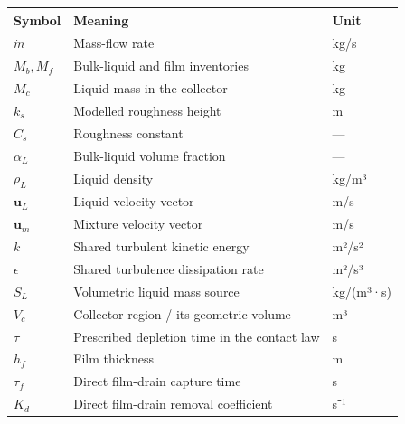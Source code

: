 \documentclass[12pt]{article}
\newcounter{none}
\begin{document}
\begingroup\small\setlength{\tabcolsep}{3pt}
{\def\LTcaptype{none} %
\begin{longtable}[]{@{}
  >{\raggedright\arraybackslash}p{}
  >{\raggedright\arraybackslash}p{}
  >{\raggedright\arraybackslash}p{}@{}}
\toprule\noalign{}
\begin{minipage}[b]{\linewidth}\raggedright
Symbol
\end{minipage} & \begin{minipage}[b]{\linewidth}\raggedright
Meaning
\end{minipage} & \begin{minipage}[b]{\linewidth}\raggedright
Unit
\end{minipage} \\
\midrule\noalign{}
\endhead
\bottomrule\noalign{}
\endlastfoot
\(\dot m\) & Mass-flow rate & kg/s \\
\(M_b, M_f\) & Bulk-liquid and film inventories & kg \\
\(M_c\) & Liquid mass in the collector & kg \\
\(k_s\) & Modelled roughness height & m \\
\(C_s\) & Roughness constant & --- \\
\(\alpha_L\) & Bulk-liquid volume fraction & --- \\
\(\rho_L\) & Liquid density & kg/m³ \\
\(\boldsymbol u_L\) & Liquid velocity vector & m/s \\
\(\boldsymbol u_m\) & Mixture velocity vector & m/s \\
\(k\) & Shared turbulent kinetic energy & m²/s² \\
\(\epsilon\) & Shared turbulence dissipation rate & m²/s³ \\
\(S_L\) & Volumetric liquid mass source & kg/(m³·s) \\
\(V_c\) & Collector region / its geometric volume & m³ \\
\(\tau\) & Prescribed depletion time in the contact law & s \\
\(h_f\) & Film thickness & m \\
\(\tau_f\) & Direct film-drain capture time & s \\
\(K_d\) & Direct film-drain removal coefficient & s⁻¹ \\
\end{longtable}
}
\endgroup
\end{document}

